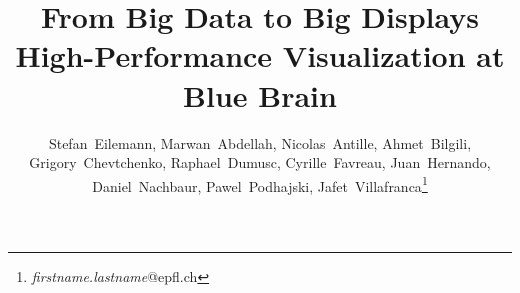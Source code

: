 \documentclass[10pt]{llncs}
\begin{document}
\lstset{language=[11]C++,basicstyle=\scriptsize,captionpos=b}
%
\title{From Big Data to Big Displays\\
High-Performance Visualization at Blue Brain}

%
%
%
%

\author{\small Stefan~Eilemann, Marwan~Abdellah, Nicolas~Antille, Ahmet~Bilgili, Grigory~Chevtchenko, Raphael~Dumusc, Cyrille~Favreau, Juan~Hernando, Daniel~Nachbaur, Pawel~Podhajski, Jafet~Villafranca\thanks{\textit{firstname.lastname}@epfl.ch}}

\maketitle
\end{document}
